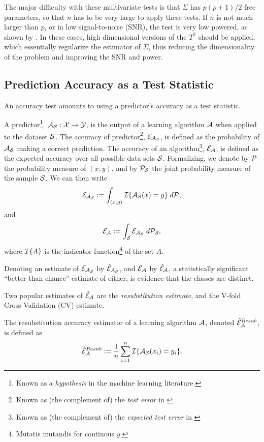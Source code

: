 \documentclass[12pt,a4paper]{article}
\begin{document}
The major difficulty with these multivariate tests is that $\Sigma$ has $p(p+1)/2$ free parameters, so that $n$ has to be very large to apply these tests.
If $n$ is not much larger than $p$, or in low signal-to-noise (SNR), the test is very low powered, as shown by \cite{bai1996effect}. 
In these cases, high dimensional versions of the $T^2$ should be applied, which essentially regularize the estimator of $\Sigma$, thus reducing the dimensionality of the problem and improving the SNR and power.



\subsection{Prediction Accuracy as a Test Statistic}
An accuracy test amounts to using a predictor's accuracy as a test statistic.  

A predictor\footnote{Known as a \emph{hypothesis} in the machine learning literature.}, $\mathcal{A}_{\mathcal{S}}:\mathcal{X} \to \mathcal{Y}$, is the output of a learning algorithm $\mathcal{A}$ when applied to the dataset $\mathcal{S}$. 
The accuracy of predictor\footnote{Known as (the complement of) the \emph{test error} in \cite{hastie_elements_2003}}, $\mathcal{E}_{\mathcal{A}_{\mathcal{S}}}$, is defined as the probability of $\mathcal{A}_{\mathcal{S}}$ making a correct prediction. 
The accuracy of an algorithm\footnote{Known as (the complement of) the \emph{expected test error} in \cite{hastie_elements_2003}}, $\mathcal{E}_{\mathcal{A}}$, is defined as the expected accuracy over all possible data sets $\mathcal{S}$. 
Formalizing, we denote by $\mathcal{P}$ the probability measure of $(x, y)$, and by $\mathcal{P}_{\mathcal{S}}$ the joint probability measure of the sample $\mathcal{S}$. 
We can then write 
\begin{align}
	\mathcal{E}_{\mathcal{A}_{\mathcal{S}}}:=\int_{(x,y)} \mathcal{I}{\{ \mathcal{A}_{\mathcal{S}}(x)=y \}} \; d\mathcal{P},
\end{align}
and
\begin{align}
	\mathcal{E}_{\mathcal{A}}:=\int_{\mathcal{S}} \mathcal{E}_{\mathcal{A}_{\mathcal{S}}} \; d\mathcal{P}_{\mathcal{S}},
\end{align}
where $\mathcal{I}{\{ A \}}$ is the indicator function\footnote{Mutatis mutandis for continous $y$.} of the set $A$. 

Denoting an estimate of $\mathcal{E}_{\mathcal{A}_{\mathcal{S}}}$ by $\hat{\mathcal{E}}_{\mathcal{A}_{\mathcal{S}}}$, and $\mathcal{E}_{\mathcal{A}}$ by $\hat{\mathcal{E}}_{\mathcal{A}}$, a statistically significant ``better than chance'' estimate of either, is evidence that the classes are distinct. 

Two popular estimates of $\hat{\mathcal{E}}_{\mathcal{A}}$ are the \emph{resubstitution estimate}, and the V-fold Cross Validation (CV) estimate.
\begin{definition}
\label{def:resubstitution}
The resubstitution accuracy estimator of a learning algorithm $\mathcal{A}$, denoted $\hat{\mathcal{E}}_{\mathcal{A}}^{Resub}$,  is defined as
\begin{align}
	\hat{\mathcal{E}}_{\mathcal{A}}^{Resub} := \frac 1n \sum_{i=1}^{n} \mathcal{I}{\{ \mathcal{A}_{\mathcal{S}}(x_i)=y_i \}}.
\end{align}
\end{definition}
\end{document}
